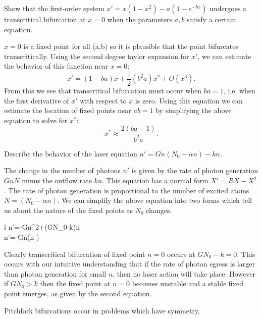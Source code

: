\documentclass{article}
\begin{document}
\begin{example}
	Show that the first-order system \(x'=x(1-x^2)-a(1-e^{-bx})\) undergoes a transcritical bifurcation at \(x=0\) when the parameters \(a,b\) satisfy a certain equation.
	\begin{IEEEproof}
		\(x=0\) is a fixed point for all (a,b) so it is plausible that the point bifurcates transcritically. Using the second degree taylor expansion for \(x'\), we can estimate the behavior of this function near \(x=0\):
		\begin{equation*}
			x'=(1-ba)x+\frac{1}{2}(b^2a)x^2+O(x^3).
		\end{equation*}
	From this we see that transcritical bifurcation must occur when \(ba=1\), i.e. when the first derivative of \(x'\) with respect to \(x\) is zero. Using this equation we can estimate the location of fixed points near \(ab=1\) by simplifying the above equation to solve for \(x^*\):
		\begin{equation*}
			x^*\approx\frac{2(ba-1)}{b^2a}.
		\end{equation*}
	\end{IEEEproof}
\end{example}
\begin{example}
	Describe the behavior of the laser equation \(n'=Gn(N_0-\alpha n)-kn\).
	\begin{IEEEproof}
		The change in the number of photons \(n'\) is given by the rate of photon generation \(GnN\) minus the outflow rate \(kn\). This equation has a normal form \(X'=RX-X^2\). The rate of photon generation is proportional to the number of excited atoms \(N=(N_0-\alpha n)\). We can simplify the above equation into two forms which tell us about the nature of the fixed points as \(N_0\) changes.
		\begin{IEEEeqnarray*}{l}
			n'=-G\alpha n^2+(GN_0-k)n\\
			n'=-G\alpha n\bigg(n-\bigg)
		\end{IEEEeqnarray*}
		Clearly transcritical bifurcation of fixed point \(n=0\) occurs at \(GN_0-k=0\). This occurs with our intuitive understanding that if the rate of photon egress is larger than photon generation for small \(n\), then no laser action will take place. However if \(GN_0>k\) then the fixed point at \(n=0\) becomes unstable and a stable fixed point emerges, as given by the second equation.
	\end{IEEEproof}
\end{example}
\begin{definition}
	Pitchfork bifurcations occur in problems which have symmetry,
\end{definition}
\end{document}

